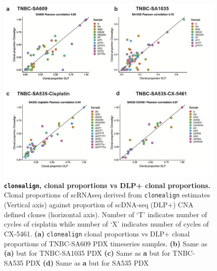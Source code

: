 \begin{figure}
\centering
\includegraphics[width=\textwidth]{Figures/chap5/Clonealigncorrelation.png}
	
\caption[\texttt{clonealign} clonal proportions vs DLP+ clonal proportions]
	{\small
	\textbf{\texttt{clonealign}, clonal proportions vs DLP+ clonal proportions.}
	   Clonal proportions of scRNAseq  derived from \texttt{clonealign} estimates (Vertical axis) against proportion of scDNA-seq (DLP+) CNA defined clones (horizontal axis). Number of `T' indicates number of cycles of cisplatin while number of `X' indicates number of cycles of CX-5461.
	   \textbf{(a)} \texttt{clonealign} clonal proportions vs DLP+ clonal proportions of TNBC-SA609 PDX timeseries samples.
	 \textbf{(b)} Same as \textbf{(a)} but for TNBC-SA1035 PDX 
	 \textbf{(c)} Same as \textbf{a} but for TNBC-SA535 PDX 
	 \textbf{(d)} Same as \textbf{a}
	 but for SA535 PDX 
	}
	 
	\label{fig:Clonealigncorrelation}
\end{figure}





